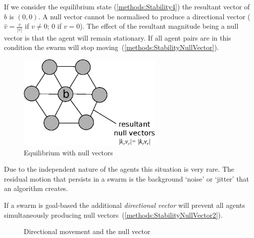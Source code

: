 If we consider the equilibrium state (\autoref{methods:Stability4}) the resultant vector of $b$ is $(0,0)$. A null vector cannot be normalised to produce a directional vector ($\hat{v} = \frac{v}{|v|}$ if $v\neq0$; $0$ if $v=0$). The effect of the resultant magnitude being a null vector is that the agent will remain stationary. If all agent pairs are in this condition the swarm will stop moving~(\autoref{methods:StabilityNullVector}).

\begin{figure}[H]
\begin{center}
\includegraphics[width=7cm]{CHAPTER-4/figures/StabilityNullVector}
\end{center}
\caption{Equilibrium with null vectors} \label{methods:StabilityNullVector}
\end{figure}

Due to the independent nature of the agents this situation is very rare. The residual motion that persists in a swarm is the background `noise' or `jitter' that an algorithm creates.

If a swarm is goal-based the additional \textit{directional vector} will prevent all agents simultaneously producing null vectors~(\autoref{methods:StabilityNullVector2}).

\begin{figure}[H]
\centering
{}
\caption{Directional movement and the null vector}
\label{methods:StabilityNullVector2}
\end{figure}

